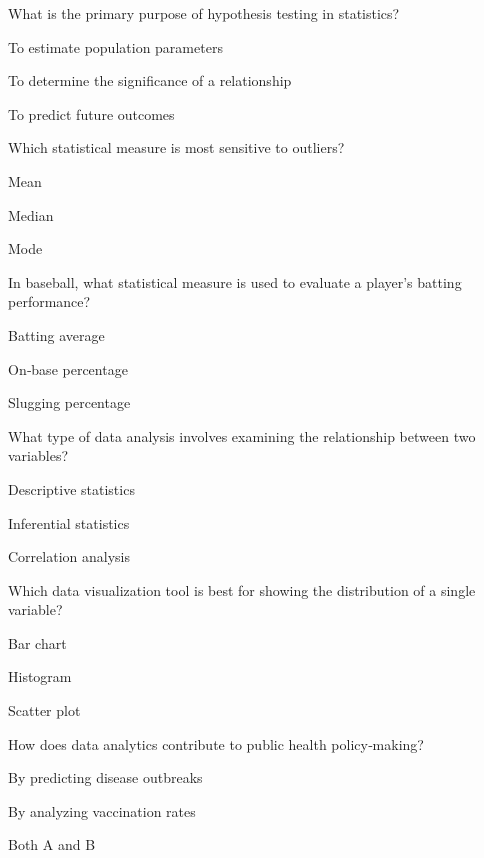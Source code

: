 
\begin{enhancedmcq}{What is the primary purpose of hypothesis testing in statistics?}
\item To estimate population parameters
\item To determine the significance of a relationship
\item To predict future outcomes

\end{enhancedmcq}
\begin{enhancedmcq}{Which statistical measure is most sensitive to outliers?}
\item Mean
\item Median
\item Mode

\end{enhancedmcq}
\begin{enhancedmcq}{In baseball, what statistical measure is used to evaluate a player's batting performance?}
\item Batting average
\item On‑base percentage
\item Slugging percentage

\end{enhancedmcq}
\begin{enhancedmcq}{What type of data analysis involves examining the relationship between two variables?}
\item Descriptive statistics
\item Inferential statistics
\item Correlation analysis

\end{enhancedmcq}
\begin{enhancedmcq}{Which data visualization tool is best for showing the distribution of a single variable?}
\item Bar chart
\item Histogram
\item Scatter plot

\end{enhancedmcq}
\begin{enhancedmcq}{How does data analytics contribute to public health policy‑making?}
\item By predicting disease outbreaks
\item By analyzing vaccination rates
\item Both A and B

\end{enhancedmcq}
